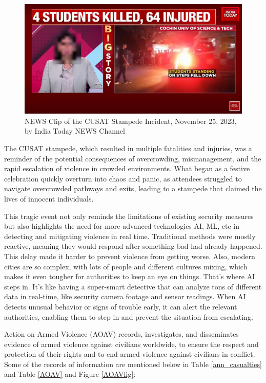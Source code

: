 \begin{figure}[htbp!]
    \centering
    \includegraphics[width=1\linewidth]{Images/stampede.png}
    \caption[NEWS Clip of the CUSAT Stampede Incident]{NEWS Clip of the CUSAT Stampede Incident, November 25, 2023, by India Today NEWS Channel}
    \label{CUSAT}
\end{figure}

\noindent The CUSAT stampede, which resulted in multiple fatalities and injuries, was a reminder of the potential consequences of overcrowding, mismanagement, and the rapid escalation of violence in crowded environments. What began as a festive celebration quickly overturn into chaos and panic, as attendees struggled to navigate overcrowded pathways and exits, leading to a stampede that claimed the lives of innocent individuals.

\clearpage

\noindent This tragic event not only reminds the limitations of existing security measures but also highlights the need for more advanced technologies AI, ML, etc in detecting and mitigating violence in real time. Traditional methods were mostly reactive, meaning they would respond after something bad had already happened\cite{manual_Violence}. This delay made it harder to prevent violence from getting worse. Also, modern cities are so complex, with lots of people and different cultures mixing, which makes it even tougher for authorities to keep an eye on things. That's where AI steps in. It's like having a super-smart detective that can analyze tons of different data in real-time, like security camera footage and sensor readings\cite{ai_saftey}. When AI detects unusual behavior or signs of trouble early, it can alert the relevant authorities, enabling them to step in and prevent the situation from escalating.

\noindent Action on Armed Violence (AOAV) records, investigates, and disseminates evidence of armed violence against civilians worldwide, to ensure the respect and protection of their rights and to end armed violence against civilians in conflict. Some of the records of information are mentioned below in Table \ref{ann_casualties} and Table \ref{AOAV} and Figure \ref{AOAVfig}: 

